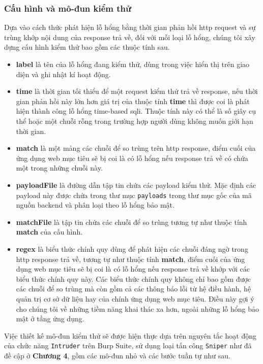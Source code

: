 \subsubsection{Cấu hình và mô-đun kiểm thử}
Dựa vào cách thức phát hiện lỗ hổng bằng thời gian phản hồi \acrshort{http} request và sự trùng khớp nội dung của response trả về, đối với mỗi loại lỗ hổng, chúng tôi xây dựng cấu hình kiểm thử bao gồm các thuộc tính sau. 
\begin{itemize}
    \item \textbf{label} là tên của lỗ hổng đang kiểm thử, dùng trong việc hiển thị trên giao diện và ghi nhật kí hoạt động.
    \item \textbf{time} là thời gian tối thiểu để một request kiểm thử trả về response, nếu thời gian phản hồi này lớn hơn giá trị của thuộc tính \textbf{time} thì được coi là phát hiện thành công lỗ hổng time-based \acrshort{sqli}. Thuộc tính này có thể là số giây cụ thể hoặc một chuỗi rỗng trong trường hợp người dùng không muốn giới hạn thời gian.
    \item \textbf{match} là một mảng các chuỗi để so trùng trên \acrshort{http} response, điểm cuối của ứng dụng web mục tiêu sẽ bị coi là có lỗ hổng nếu response trả về có chứa một trong những chuỗi này. 
    \item \textbf{payloadFile} là đường dẫn tập tin chứa các payload kiểm thử. Mặc định các payload này được chứa trong thư mục \texttt{payloads} trong thư mục gốc của mã nguồn backend và phân loại theo lỗ hổng bảo mật.
    \item \textbf{matchFile} là tập tin chứa các chuỗi để so trùng tương tự như thuộc tính \textbf{match} của cấu hình.
    \item \textbf{regex} là biểu thức chính quy dùng để phát hiện các chuỗi đáng ngờ trong \acrshort{http} response trả về, tương tự như thuộc tính \textbf{match}, điểm cuối của ứng dụng web mục tiêu sẽ bị coi là có lỗ hổng nếu response trả về khớp với các biểu thức chính quy này. Các biểu thức chính quy không chỉ bao gồm được các chuỗi để so trùng mà còn gồm cả các thông báo lỗi từ hệ điều hành, hệ quản trị cơ sở dữ liệu hay của chính ứng dụng web mục tiêu. Điều này gợi ý cho chúng tôi về những tiềm năng khai thác xa hơn, ngoài những lỗ hổng bảo mật ở tầng ứng dụng.
\end{itemize}
Việc thiết kế mô-đun kiểm thử sẽ được hiện thực dựa trên nguyên tắc hoạt động của chức năng \texttt{Intruder} trên Burp Suite, sử dụng loại tấn công \texttt{Sniper} như đã đề cập ở \textbf{Chương 4}, gồm các mô-đun nhỏ và các bước tuần tự như sau.
